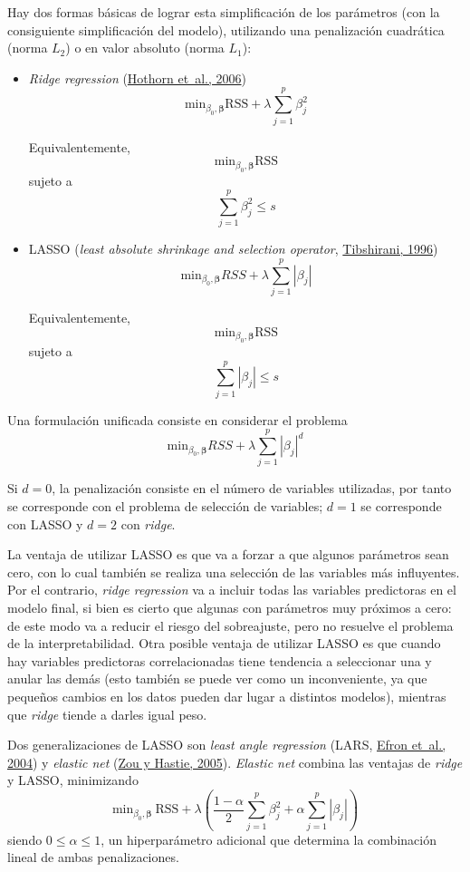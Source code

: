 \documentclass[
]{book}
\theoremstyle{break}
\theoremstyle{nonumberplain}
\begin{document}
Hay dos formas básicas de lograr esta simplificación de los parámetros (con la consiguiente simplificación del modelo), utilizando una penalización cuadrática (norma \(L_2\)) o en valor absoluto (norma \(L_1\)):

\begin{itemize}
\item
  \emph{Ridge regression} (\protect\hyperlink{ref-hothorn2006unbiased}{Hothorn et~al., 2006})
  \[\mbox{min}_{\beta_0, \boldsymbol{\beta}} \mbox{RSS} + \lambda\sum_{j=1}^{p}\beta_{j}^{2}\]

  Equivalentemente,
  \[\mbox{min}_{\beta_0, \boldsymbol{\beta}} \mbox{RSS}\]
  sujeto a
  \[\sum_{j=1}^{p}\beta_{j}^{2} \le s\]
\item
  LASSO (\emph{least absolute shrinkage and selection operator}, \protect\hyperlink{ref-tibshirani1996regression}{Tibshirani, 1996})
  \[\mbox{min}_{\beta_0, \boldsymbol{\beta}} RSS + \lambda\sum_{j=1}^{p}|\beta_{j}|\]

  Equivalentemente,
  \[\mbox{min}_{\beta_0, \boldsymbol{\beta}} \mbox{RSS}\]
  sujeto a
  \[\sum_{j=1}^{p}|\beta_{j}| \le s\]
\end{itemize}

Una formulación unificada consiste en considerar el problema
\[\mbox{min}_{\beta_0, \boldsymbol{\beta}} RSS + \lambda\sum_{j=1}^{p}|\beta_{j}|^d\]

Si \(d=0\), la penalización consiste en el número de variables utilizadas, por tanto se corresponde con el problema de selección de variables; \(d=1\) se corresponde con LASSO y \(d=2\) con \emph{ridge}.

La ventaja de utilizar LASSO es que va a forzar a que algunos parámetros sean cero, con lo cual también se realiza una selección de las variables más influyentes.
Por el contrario, \emph{ridge regression} va a incluir todas las variables predictoras en el modelo final, si bien es cierto que algunas con parámetros muy próximos a cero: de este modo va a reducir el riesgo del sobreajuste, pero no resuelve el problema de la interpretabilidad.
Otra posible ventaja de utilizar LASSO es que cuando hay variables predictoras correlacionadas tiene tendencia a seleccionar una y anular las demás (esto también se puede ver como un inconveniente, ya que pequeños cambios en los datos pueden dar lugar a distintos modelos), mientras que \emph{ridge} tiende a darles igual peso.

Dos generalizaciones de LASSO son \emph{least angle regression} (LARS, \protect\hyperlink{ref-efron2004least}{Efron et~al., 2004}) y \emph{elastic net} (\protect\hyperlink{ref-zou2005regularization}{Zou y Hastie, 2005}).
\emph{Elastic net} combina las ventajas de \emph{ridge} y LASSO, minimizando
\[\mbox{min}_{\beta_0, \boldsymbol{\beta}} \ \mbox{RSS} + \lambda \left( \frac{1 - \alpha}{2}\sum_{j=1}^{p}\beta_{j}^{2} + \alpha \sum_{j=1}^{p}|\beta_{j}| \right)\]
siendo \(0 \leq \alpha \leq 1\), un hiperparámetro adicional que determina la combinación lineal de ambas penalizaciones.
\end{document}
